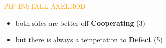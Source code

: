 \documentclass[usenames,dvipsnames,t]{beamer}
\begin{document}
\begin{frame}[fragile]

\begin{columns}
  \begin{column}{.49\linewidth}
   \vspace{1cm}

    \centering
    {\fontsize{120}{130}\selectfont\textcolor{orange}{PIP \hspace{2cm} INSTALL \hspace{2cm} AXELROD}}
    \Large{
    \begin{multicols}{2}
    \begin{itemize}
      \item both sides are better off \textbf{Cooperating} (3)
      \item but there is always a tempetation to \textbf{Defect} (5)
    \end{itemize}
    \end{multicols}
    }
  \end{column}
  \begin{column}{.25\linewidth}

    \centering
   
  \end{column}


  \end{columns}
  \begin{columns}
    \begin{column}{.25\linewidth}
   \vspace{1cm}


\end{column}
\end{columns}
\end{frame}
\end{document}
